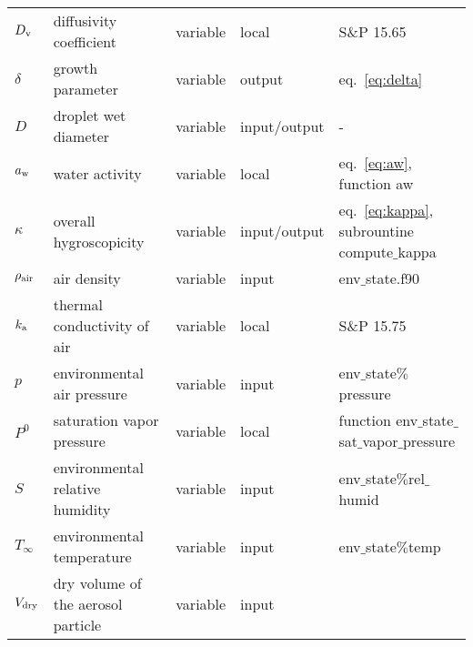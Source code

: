 \documentclass{article}
\begin{document}
\begin{tabular}{p{1cm} p{4cm} p{1.5cm} l l}
\hline
$D_{\rm v}$     & diffusivity coefficient   &  variable & local &  S$\&$P 15.65  \\
$\delta$  & growth parameter &  variable & output & eq.~\ref{eq:delta}\\
$D$     &  droplet wet diameter  & variable  & input/output &   -   \\
$a_{\rm w}$  & water activity  &variable & local & eq.~\ref{eq:aw},  function aw  \\
$\kappa$      &  overall hygroscopicity   &  variable & input/output  &  eq.~\ref{eq:kappa}, subrountine compute$\_$kappa   \\
$ \rho_{\rm air}$    &  air density   &  variable  & input  &   env$\_$state.f90   \\
$k_{\rm a} $     & thermal conductivity of air    &  variable & local &   S$\&$P 15.75   \\
$ p $     &  environmental air pressure &  variable  & input  &  env$\_$state$\%$pressure  \\
$ P^{0}  $   & saturation vapor pressure &  variable & local &  function env$\_$state$\_$sat$\_$vapor$\_$pressure  \\
$S $     &  environmental relative humidity  &  variable  & input  &  env$\_$state$\%$rel$\_$humid  \\
$ T_{\infty}$     &  environmental temperature  &  variable  & input  &  env$\_$state$\%$temp  \\
$ V_{\rm dry}$       & dry volume of the aerosol particle   &  variable  & input  &    \\

\hline 
\end{tabular}
\end{document}
